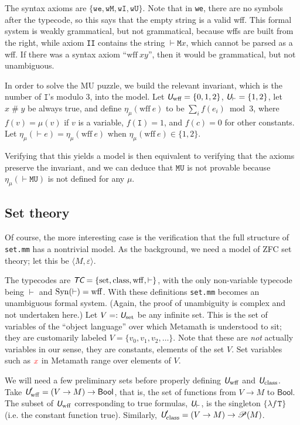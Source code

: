 \documentclass[runningheads,a4paper]{llncs}
\newcommand{\tc}{\textit{\textsf{TC}}} %
\newcommand{\uv}{\textit{\textsf{U}}} %
\newcommand{\ang}[1]{\langle#1\rangle}
\newcommand{\syn}{{\rm Syn}}
\newcommand{\fresh}{\mathbin{\#}}
\newcommand{\bool}{\textsf{Bool}}
\newcommand{\tT}{\texttt{T}}
\newcommand{\tM}{\texttt{M}}
\newcommand{\tI}{\texttt{I}}
\newcommand{\tU}{\texttt{U}}
\newcommand{\ep}{\mathbin{\varepsilon}}
\newcommand{\pow}[1]{\mathscr{P}(#1)}
\begin{document}
The syntax axioms are $\{\texttt{we},\texttt{wM},\texttt{wI},\texttt{wU}\}$. Note that in \texttt{we}, there are no symbols after the typecode, so this says that the empty string is a valid wff. This formal system is weakly grammatical, but not grammatical, because wffs are built from the right, while axiom \texttt{II} contains the string $\vdash\tM x$, which cannot be parsed as a wff. If there was a syntax axiom ``$\textrm{wff}\ x y$'', then it would be grammatical, but not unambiguous.

In order to solve the MU puzzle, we build the relevant invariant, which is the number of $\texttt{I}$'s modulo $3$, into the model. Let $\uv_\textrm{wff}=\{0,1,2\}$, $\uv_\vdash=\{1,2\}$, let $x\fresh y$ be always true, and define $\eta_\mu(\textrm{wff}\ e)$ to be $\sum_i f(e_i)\bmod 3$, where $f(v)=\mu(v)$ if $v$ is a variable, $f(\tI)=1$, and $f(c)=0$ for other constants. Let $\eta_\mu(\vdash e)=\eta_\mu(\textrm{wff}\ e)$ when $\eta_\mu(\textrm{wff}\ e)\in\{1,2\}$. 

Verifying that this yields a model is then equivalent to verifying that the axioms preserve the invariant, and we can deduce that $\tM\tU$ is not provable because $\eta_\mu(\vdash\tM\tU)$ is not defined for any $\mu$.

\subsection{Set theory}\label{sec:setmm}
Of course, the more interesting case is the verification that the full structure of \texttt{set.mm} has a nontrivial model. As the background, we need a model of \textsf{ZFC} set theory; let this be $\ang{M,\ep}$.

The typecodes are $\tc=\{\mathrm{set},\mathrm{class},\mathrm{wff},\vdash\}$, with the only non-variable typecode being $\vdash$ and $\syn(\vdash)=\mathrm{wff}$. With these definitions \texttt{set.mm} becomes an unambiguous formal system. (Again, the proof of unambiguity is complex and not undertaken here.) Let $V=:\uv_\mathrm{set}$ be any infinite set.  This is the set of variables of the ``object language'' over which Metamath is understood to sit; they are customarily labeled $V=\{v_0,v_1,v_2,\dots\}$. Note that these are {\em not} actually variables in our sense, they are constants, elements of the set $V$. Set variables such as $\color{red} x$ in Metamath range over elements of $V$.  

We will need a few preliminary sets before properly defining $\uv_\mathrm{wff}$ and $\uv_\mathrm{class}$. Take $\uv'_\mathrm{wff}=(V\to M)\to\bool$, that is, the set of functions from $V\to M$ to $\bool$. The subset of $\uv_\mathrm{wff}$ corresponding to true formulas, $\uv_\vdash$, is the singleton $\{\lambda f\,\tT\}$ (i.e. the constant function true). Similarly, $\uv'_\mathrm{class}=(V\to M)\to\pow{M}$.
\end{document}
